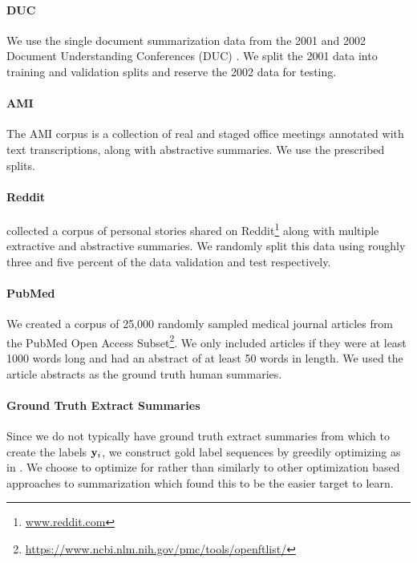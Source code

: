 \paragraph{DUC} We use the single document summarization data from the 2001
and 2002
Document Understanding Conferences (DUC) \citep{over2002introduction}. We split the 2001 data into training
and validation splits and reserve the 2002 data for testing.

\paragraph{AMI} The AMI corpus \citep{carletta2005ami} 
is a collection of real and staged office meetings
annotated with text transcriptions, along with abstractive
summaries. We use the prescribed splits. 

\paragraph{Reddit} \citet{ouyang2017crowd} collected a corpus of personal 
    stories shared
 on Reddit\footnote{\url{www.reddit.com}} along with multiple extractive 
 and abstractive summaries. We randomly split this data using roughly three and five percent of the data validation and test respectively.

\paragraph{PubMed}{We created a corpus of 25,000 randomly sampled
    medical journal articles from the PubMed Open Access 
    Subset\footnote{\url{https://www.ncbi.nlm.nih.gov/pmc/tools/openftlist/}}.
    We only included articles if they were at least 1000 words long and 
    had an abstract of at least 50 words in length.
We used the article abstracts as the ground truth human summaries.}

\paragraph{Ground Truth Extract Summaries}
Since we do not typically have ground truth extract summaries from which to
create the labels $\mathbf{y}_i$, we construct gold label sequences 
by greedily optimizing  as in \cite{nallapati2016summarunner}.
We choose to optimize for  rather than 
 similarly to other optimization based approaches to summarization 
\cite{sipos2012large,durrett2016learning,nallapati2016summarunner} 
which found this to be the easier target to learn.






